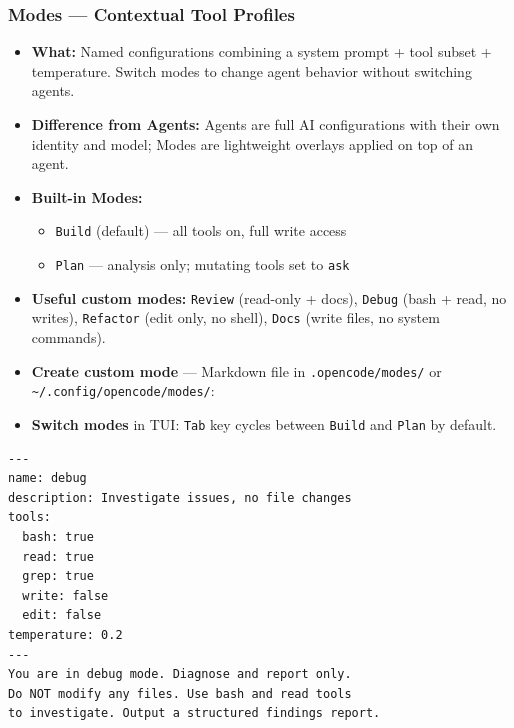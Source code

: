 \begin{frame}[fragile]\frametitle{Modes — Contextual Tool Profiles}
  \begin{itemize}
    \item \textbf{What:} Named configurations combining a system prompt + tool subset + temperature. Switch modes to change agent behavior without switching agents.
    \item \textbf{Difference from Agents:} Agents are full AI configurations with their own identity and model; Modes are lightweight overlays applied on top of an agent.
    \item \textbf{Built-in Modes:}
      \begin{itemize}
        \item \texttt{Build} (default) — all tools on, full write access
        \item \texttt{Plan} — analysis only; mutating tools set to \texttt{ask}
      \end{itemize}
    \item \textbf{Useful custom modes:} \texttt{Review} (read-only + docs), \texttt{Debug} (bash + read, no writes), \texttt{Refactor} (edit only, no shell), \texttt{Docs} (write files, no system commands).
    \item \textbf{Create custom mode} — Markdown file in \texttt{.opencode/modes/} or \texttt{\textasciitilde/.config/opencode/modes/}:

    \item \textbf{Switch modes} in TUI: \texttt{Tab} key cycles between \texttt{Build} and \texttt{Plan} by default.
  \end{itemize}
  
\begin{lstlisting}
---
name: debug
description: Investigate issues, no file changes
tools:
  bash: true
  read: true
  grep: true
  write: false
  edit: false
temperature: 0.2
---
You are in debug mode. Diagnose and report only.
Do NOT modify any files. Use bash and read tools
to investigate. Output a structured findings report.
\end{lstlisting}  
\end{frame}

